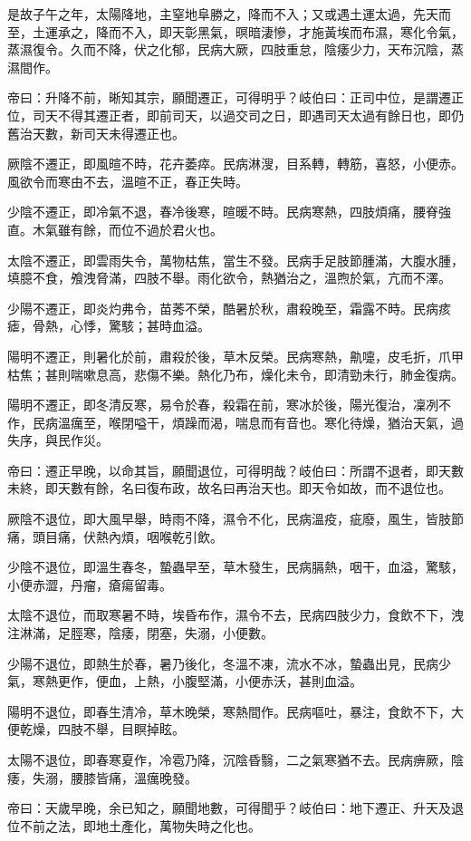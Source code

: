 是故子午之年，太陽降地，主窒地阜勝之，降而不入；又或遇土運太過，先天而至，土運承之，降而不入，即天彰黑氣，暝暗淒慘，才施黃埃而布濕，寒化令氣，蒸濕復令。久而不降，伏之化郁，民病大厥，四肢重怠，陰痿少力，天布沉陰，蒸濕間作。

帝曰：升降不前，晰知其宗，願聞遷正，可得明乎？岐伯曰：正司中位，是謂遷正位，司天不得其遷正者，即前司天，以過交司之日，即遇司天太過有餘日也，即仍舊治天數，新司天未得遷正也。

厥陰不遷正，即風暄不時，花卉萎瘁。民病淋溲，目系轉，轉筋，喜怒，小便赤。風欲令而寒由不去，溫暄不正，春正失時。

少陰不遷正，即冷氣不退，春冷後寒，暄暖不時。民病寒熱，四肢煩痛，腰脊強直。木氣雖有餘，而位不過於君火也。

太陰不遷正，即雲雨失令，萬物枯焦，當生不發。民病手足肢節腫滿，大腹水腫，填臆不食，飧洩脅滿，四肢不舉。雨化欲令，熱猶治之，溫煦於氣，亢而不澤。

少陽不遷正，即炎灼弗令，苗莠不榮，酷暑於秋，肅殺晚至，霜露不時。民病痎瘧，骨熱，心悸，驚駭；甚時血溢。

陽明不遷正，則暑化於前，肅殺於後，草木反榮。民病寒熱，鼽嚏，皮毛折，爪甲枯焦；甚則喘嗽息高，悲傷不樂。熱化乃布，燥化未令，即清勁未行，肺金復病。

陽明不遷正，即冬清反寒，易令於春，殺霜在前，寒冰於後，陽光復治，凜冽不作，民病溫癘至，喉閉嗌干，煩躁而渴，喘息而有音也。寒化待燥，猶治天氣，過失序，與民作災。

帝曰：遷正早晚，以命其旨，願聞退位，可得明哉？岐伯曰：所謂不退者，即天數未終，即天數有餘，名曰復布政，故名曰再治天也。即天令如故，而不退位也。

厥陰不退位，即大風早舉，時雨不降，濕令不化，民病溫疫，疵廢，風生，皆肢節痛，頭目痛，伏熱內煩，咽喉乾引飲。

少陰不退位，即溫生春冬，蟄蟲早至，草木發生，民病膈熱，咽干，血溢，驚駭，小便赤澀，丹瘤，瘡瘍留毒。

太陰不退位，而取寒暑不時，埃昏布作，濕令不去，民病四肢少力，食飲不下，洩注淋滿，足脛寒，陰痿，閉塞，失溺，小便數。

少陽不退位，即熱生於春，暑乃後化，冬溫不凍，流水不冰，蟄蟲出見，民病少氣，寒熱更作，便血，上熱，小腹堅滿，小便赤沃，甚則血溢。

陽明不退位，即春生清冷，草木晚榮，寒熱間作。民病嘔吐，暴注，食飲不下，大便乾燥，四肢不舉，目瞑掉眩。

太陽不退位，即春寒夏作，冷雹乃降，沉陰昏翳，二之氣寒猶不去。民病痹厥，陰痿，失溺，腰膝皆痛，溫癘晚發。

帝曰：天歲早晚，余已知之，願聞地數，可得聞乎？岐伯曰：地下遷正、升天及退位不前之法，即地土產化，萬物失時之化也。

